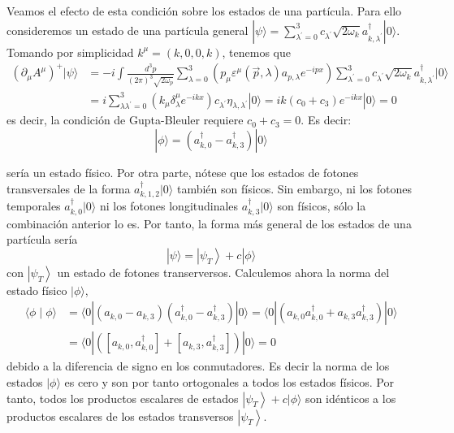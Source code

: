 Veamos el efecto de esta condición sobre los estados de una partícula. Para ello consideremos un estado de una partícula general $|\psi\rangle=\sum_{\lambda^{\prime}=0}^{3} c_{\lambda^{\prime}} \sqrt{2 \omega_{k}} a_{k, \lambda^{\prime}}^{\dagger}|0\rangle$. Tomando por simplicidad $k^{\mu}=(k, 0,0, k)$, tenemos que
$$
\begin{align*}
\left(\partial_{\mu} A^{\mu}\right)^{+}|\psi\rangle & =-i \int \frac{d^{3} p}{(2 \pi)^{3} \sqrt{2 \omega_{p}}} \sum_{\lambda=0}^{3}\left(p_{\mu} \varepsilon^{\mu}(\vec{p}, \lambda) a_{p, \lambda} e^{-i p x}\right) \sum_{\lambda^{\prime}=0}^{3} c_{\lambda^{\prime}} \sqrt{2 \omega_{k}} a_{k, \lambda^{\prime}}^{\dagger}|0\rangle \\
& =i \sum_{\lambda \lambda^{\prime}=0}^{3}\left(k_{\mu} \delta_{\lambda}^{\mu} e^{-i k x}\right) c_{\lambda^{\prime}} \eta_{\lambda, \lambda^{\prime}}|0\rangle=i k\left(c_{0}+c_{3}\right) e^{-i k x}|0\rangle=0 \tag{6.67}
\end{align*}
$$
es decir, la condición de Gupta-Bleuler requiere $c_{0}+c_{3}=0$. Es decir:
\begin{equation*}
|\phi\rangle=\left(a_{k, 0}^{\dagger}-a_{k, 3}^{\dagger}\right)|0\rangle \tag{6.68}
\end{equation*}


sería un estado físico. Por otra parte, nótese que los estados de fotones transversales de la forma $a_{k, 1,2}^{\dagger}|0\rangle$ también son físicos. Sin embargo, ni los fotones temporales $a_{k, 0}^{\dagger}|0\rangle$ ni los fotones longitudinales $a_{k, 3}^{\dagger}|0\rangle$ son físicos, sólo la combinación anterior lo es. Por tanto, la forma más general de los estados de una partícula sería
\begin{equation*}
|\psi\rangle=\left|\psi_{T}\right\rangle+c|\phi\rangle \tag{6.69}
\end{equation*}
con $\left|\psi_{T}\right\rangle$ un estado de fotones transerversos.
Calculemos ahora la norma del estado físico $|\phi\rangle$,
$$
\begin{align*}
\langle\phi \mid \phi\rangle & =\langle 0|\left(a_{k, 0}-a_{k, 3}\right)\left(a_{k, 0}^{\dagger}-a_{k, 3}^{\dagger}\right)|0\rangle=\langle 0|\left(a_{k, 0} a_{k, 0}^{\dagger}+a_{k, 3} a_{k, 3}^{\dagger}\right)|0\rangle \\
& =\langle 0|\left(\left[a_{k, 0}, a_{k, 0}^{\dagger}\right]+\left[a_{k, 3}, a_{k, 3}^{\dagger}\right]\right)|0\rangle=0 \tag{6.70}
\end{align*}
$$
debido a la diferencia de signo en los conmutadores. Es decir la norma de los estados $|\phi\rangle$ es cero y son por tanto ortogonales a todos los estados físicos. Por tanto, todos los productos escalares de estados $\left|\psi_{T}\right\rangle+c|\phi\rangle$ son idénticos a los productos escalares de los estados transversos $\left|\psi_{T}\right\rangle$.

